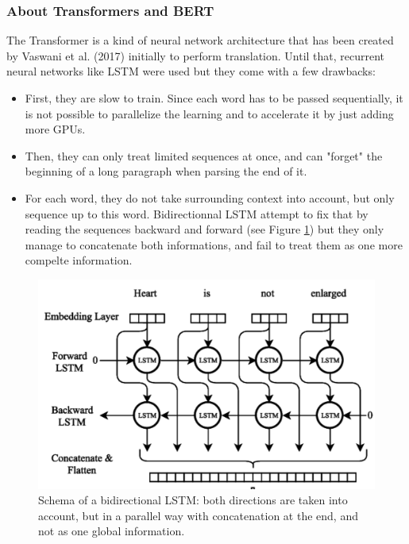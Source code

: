 \documentclass[11pt]{scrartcl}
\begin{document}
\subsubsection{About Transformers and BERT}
The Transformer is a kind of neural network architecture that has been created by Vaswani et al. (2017)\cite{vaswani2017attention} initially to perform translation. Until that, recurrent neural networks like LSTM were used but they come with a few drawbacks: \label{lstm-drawbacks}
\begin{itemize}
    \item First, they are slow to train. Since each word has to be passed sequentially, it is not possible to parallelize the learning and to accelerate it by just adding more GPUs.
    \item Then, they can only treat limited sequences at once, and can "forget" the beginning of a long paragraph when parsing the end of it.
    \item For each word, they do not take surrounding context into account, but only sequence up to this word. Bidirectionnal LSTM attempt to fix that by reading the sequences backward and forward (see Figure \ref{fig:bilstm}) but they only manage to concatenate both informations, and fail to treat them as one more compelte information.
\end{itemize}

\begin{figure}[H]
    \centering
    \includegraphics[width=12cm]{img/BiLSTM.png}
    \caption{Schema of a bidirectional LSTM: both directions are taken into account, but in a parallel way with concatenation at the end, and not as one global information.}
    \label{fig:bilstm}
\end{figure}
\end{document}
